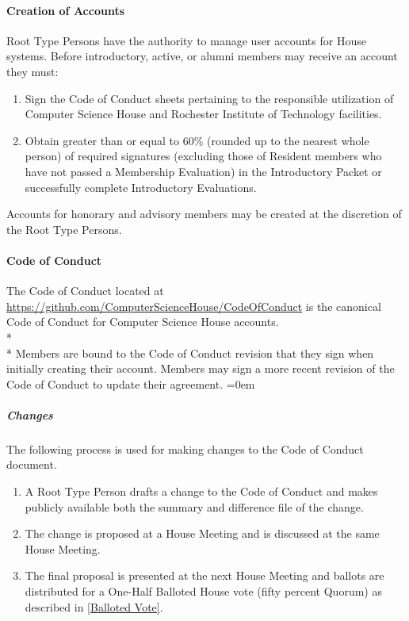 \documentclass{article}
\newcommand{\asubsubsection}[1]{\paragraph{#1} \label{#1}}
\newcommand{\asubsubsubsection}[1]{\parindent=0em\subparagraph{#1} \label{#1}}
\begin{document}
\asubsubsection{Creation of Accounts}
Root Type Persons have the authority to manage user accounts for House systems.
Before introductory, active, or alumni members may receive an account they must:
\renewcommand{\theenumi}{\alph{enumi}} %
\begin{enumerate}
	\item Sign the Code of Conduct sheets pertaining to the responsible utilization of Computer Science House and Rochester Institute of Technology facilities.
	\item Obtain greater than or equal to 60\% (rounded up to the nearest whole person) of required signatures (excluding those of Resident members who have not passed a Membership Evaluation) in the Introductory Packet or successfully complete Introductory Evaluations.
\end{enumerate}
Accounts for honorary and advisory members may be created at the discretion of the Root Type Persons.

\asubsubsection{Code of Conduct}
The Code of Conduct located at \url{https://github.com/ComputerScienceHouse/CodeOfConduct} is the canonical Code of Conduct for Computer Science House accounts.
\\* \\*
Members are bound to the Code of Conduct revision that they sign when initially creating their account.
Members may sign a more recent revision of the Code of Conduct to update their agreement.
\asubsubsubsection{Changes}
The following process is used for making changes to the Code of Conduct document.
\begin{enumerate}
	\item A Root Type Person drafts a change to the Code of Conduct and makes publicly available both the summary and difference file of the change.
	\item The change is proposed at a House Meeting and is discussed at the same House Meeting.
	\item The final proposal is presented at the next House Meeting and ballots are distributed for a One-Half Balloted House vote (fifty percent Quorum) as described in \ref{Balloted Vote}.
\end{enumerate}
\end{document}
